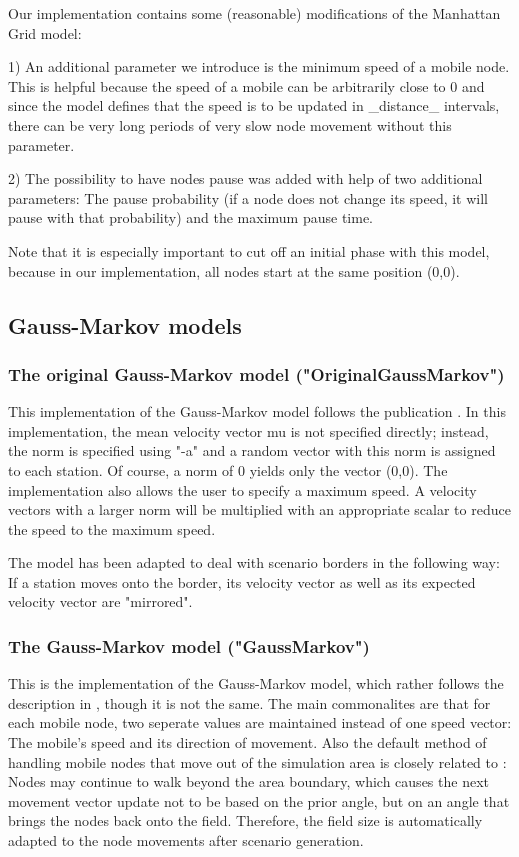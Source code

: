 \documentclass[11pt,a4paper,twoside,normalheadings,headsepline,DIV13,BCOR11mm,openright]{article}
\begin{document}
Our  implementation  contains  some  (reasonable)  modifications  of the
Manhattan Grid model:

1) An additional parameter we introduce is the minimum speed of a mobile
node.  This  is helpful because the speed of a mobile can be arbitrarily
close to 0 and since the model defines that the speed is to  be  updated
in  \_distance\_  intervals,  there  can be very long periods of very slow
node movement without this parameter.

2) The possibility to have nodes  pause  was  added  with  help  of  two
additional  parameters: The pause probability (if a node does not change
its speed, it will pause with that probability) and  the  maximum  pause
time.

Note  that  it  is especially important to cut off an initial phase with
this model, because in our implementation, all nodes start at  the  same
position (0,0).


\subsection{Gauss-Markov models}
\subsubsection{The original Gauss-Markov model ("OriginalGaussMarkov")}

This implementation of the Gauss-Markov model follows the publication
\cite{Haas_GM_1999}. In this implementation, the mean velocity vector
mu is not specified directly; instead, the norm is specified using
"-a" and a random vector with this norm is assigned to each
station. Of course, a norm of 0 yields only the vector (0,0). The
implementation also allows the user to specify a maximum speed. A
velocity vectors with a larger norm will be multiplied with an
appropriate scalar to reduce the speed to the maximum speed.

The  model  has  been  adapted  to  deal  with  scenario  borders in the
following way: If a station moves onto the border, its  velocity  vector
as well as its expected velocity vector are "mirrored".


\subsubsection{The Gauss-Markov model ("GaussMarkov")}

This is the implementation of the Gauss-Markov model, which rather
follows the description in \cite{camp_classification_2002}, though it
is not the same.  The main commonalites are that for each mobile node,
two seperate values are maintained instead of one speed vector: The
mobile's speed and its direction of movement. Also the default method
of handling mobile nodes that move out of the simulation area is
closely related to \cite{camp_classification_2002}: Nodes may continue
to walk beyond the area boundary, which causes the next movement
vector update not to be based on the prior angle, but on an angle that
brings the nodes back onto the field.  Therefore, the field size is
automatically adapted to the node movements after scenario generation.
\end{document}

